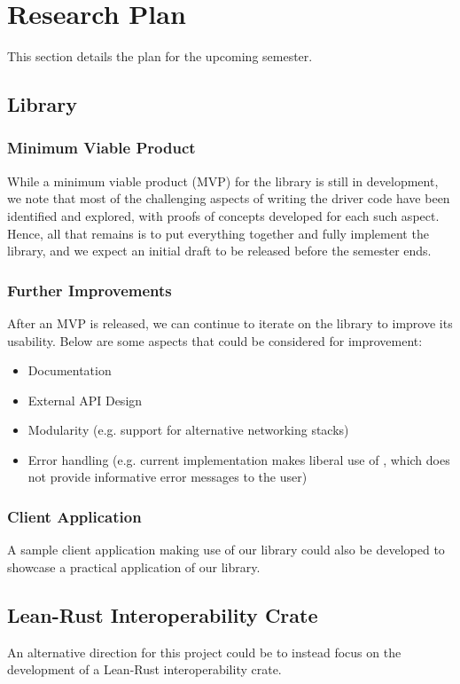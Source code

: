\chapter{Research Plan}
\label{ch:plan}

This section details the plan for the upcoming semester.

\section{Library}
\subsection{Minimum Viable Product}
While a minimum viable product (MVP) for the library is still in development, we note that most of the challenging aspects of writing the driver code have been identified and explored, with proofs of concepts developed for each such aspect. Hence, all that remains is to put everything together and fully implement the library, and we expect an initial draft to be released before the semester ends.

\subsection{Further Improvements}
After an MVP is released, we can continue to iterate on the library to improve its usability. Below are some aspects that could be considered for improvement:
\begin{itemize}
    \item Documentation
    \item External API Design
    \item Modularity (e.g. support for alternative networking stacks)
    \item Error handling (e.g. current implementation makes liberal use of , which does not provide informative error messages to the user)
\end{itemize}

\subsection{Client Application}
A sample client application making use of our library could also be developed to showcase a practical application of our library.

\section{Lean-Rust Interoperability Crate}
An alternative direction for this project could be to instead focus on the development of a Lean-Rust interoperability crate.
\\

